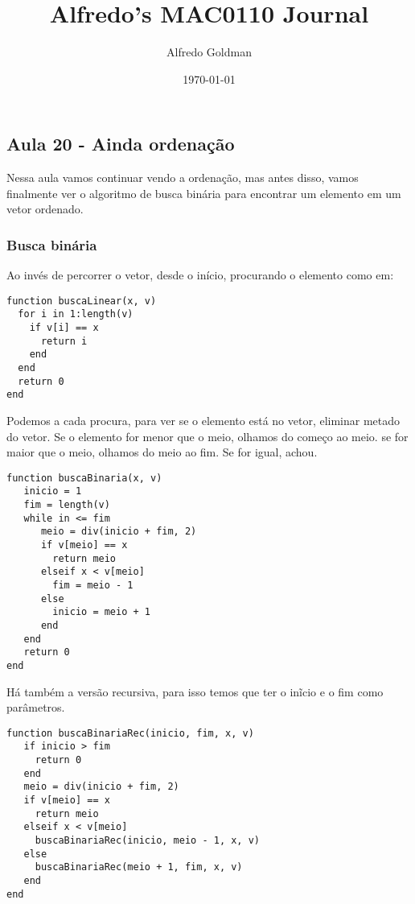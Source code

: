 \documentclass[a4paper]{article}
\author{Alfredo Goldman}
\date{\today}
\title{Alfredo's MAC0110 Journal}
\begin{document}
\maketitle

\subsection{Aula 20 - Ainda ordenação}
\label{sec:org693b0b7}

Nessa aula vamos continuar vendo a ordenação, mas antes disso,
vamos finalmente ver o algoritmo de busca binária para
encontrar um elemento em um vetor ordenado.

\subsubsection{Busca binária}
\label{sec:orgb9f7cad}
Ao invés de percorrer o vetor, desde o início, procurando o
elemento como em:
\lstset{language=ein-julia,label= ,caption= ,captionpos=b,numbers=none}
\begin{lstlisting}
function buscaLinear(x, v)
  for i in 1:length(v)
    if v[i] == x
      return i
    end
  end
  return 0
end
\end{lstlisting}

Podemos a cada procura, para ver se o elemento está
no vetor, eliminar metado do vetor. Se o elemento for
menor que o meio, olhamos do começo ao meio. se for maior
que o meio, olhamos do meio ao fim. Se for igual, achou.

\lstset{language=ein-julia,label= ,caption= ,captionpos=b,numbers=none}
\begin{lstlisting}
function buscaBinaria(x, v)
   inicio = 1
   fim = length(v)
   while in <= fim
      meio = div(inicio + fim, 2)
      if v[meio] == x
        return meio
      elseif x < v[meio]
        fim = meio - 1
      else
        inicio = meio + 1
      end
   end
   return 0
end
\end{lstlisting}

 Há também a versão recursiva, para isso temos que ter
o inĩcio e o fim como parâmetros.

\lstset{language=ein-julia,label= ,caption= ,captionpos=b,numbers=none}
\begin{lstlisting}
function buscaBinariaRec(inicio, fim, x, v)
   if inicio > fim
     return 0
   end
   meio = div(inicio + fim, 2)
   if v[meio] == x
     return meio
   elseif x < v[meio]
     buscaBinariaRec(inicio, meio - 1, x, v)
   else
     buscaBinariaRec(meio + 1, fim, x, v)
   end
end
\end{lstlisting}
\end{document}
